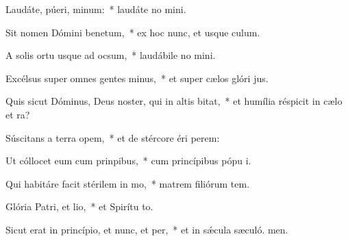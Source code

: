 \item Laudáte, púeri, minum:~* laudáte no mini.
\item Sit nomen Dómini benetum,~* ex hoc nunc, et usque  culum.
\item A solis ortu usque ad ocsum,~* laudábile no mini.
\item Excélsus super omnes gentes minus,~* et super cælos glóri jus.
\item Quis sicut Dóminus, Deus noster, qui in altis bitat,~* et humília réspicit in cælo et  ra?
\item Súscitans a terra opem,~* et de stércore éri perem:
\item Ut cóllocet eum cum prinpibus,~* cum princípibus pópu i.
\item Qui habitáre facit stérilem in mo,~* matrem filiórum tem.
\item Glória Patri, et lio,~* et Spirítu to.
\item Sicut erat in princípio, et nunc, et per,~* et in sǽcula sæculó. men.
